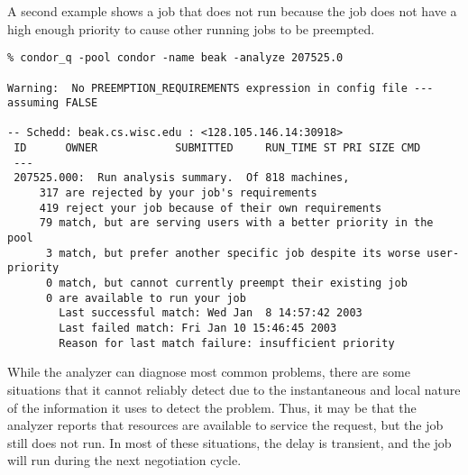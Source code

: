 A second example shows a job that does not run because the job
does not have a high enough priority to cause other running jobs
to be preempted.
\footnotesize
\begin{verbatim}
% condor_q -pool condor -name beak -analyze 207525.0

Warning:  No PREEMPTION_REQUIREMENTS expression in config file --- assuming FALSE

-- Schedd: beak.cs.wisc.edu : <128.105.146.14:30918>
 ID      OWNER            SUBMITTED     RUN_TIME ST PRI SIZE CMD
 ---
 207525.000:  Run analysis summary.  Of 818 machines,
     317 are rejected by your job's requirements
     419 reject your job because of their own requirements
     79 match, but are serving users with a better priority in the pool
      3 match, but prefer another specific job despite its worse user-priority
      0 match, but cannot currently preempt their existing job
      0 are available to run your job
        Last successful match: Wed Jan  8 14:57:42 2003
        Last failed match: Fri Jan 10 15:46:45 2003
        Reason for last match failure: insufficient priority
\end{verbatim}
\normalsize
%
%
%
%
%
%

While the analyzer can diagnose most common problems, there are some situations
that it cannot reliably detect due to the instantaneous and local nature of the
information it uses to detect the problem.  Thus, it may be that the analyzer
reports that resources are available to service the request, but the job still 
does not run.  In most of these situations, the delay is transient, and the
job will run during the next negotiation cycle.

